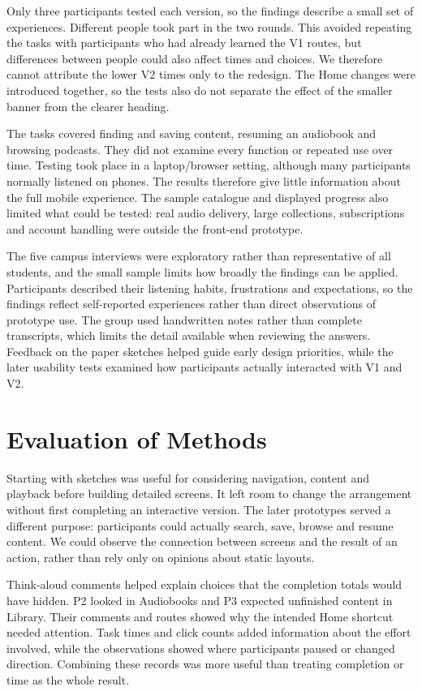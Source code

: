 Only three participants tested each version, so the findings describe a
small set of experiences. Different people took part in the two rounds.
This avoided repeating the tasks with participants who had already learned
the V1 routes, but differences between people could also affect times and
choices. We therefore cannot attribute the lower V2 times only to the
redesign. The Home changes were introduced together, so the tests also do
not separate the effect of the smaller banner from the clearer heading.

The tasks covered finding and saving content, resuming an audiobook and
browsing podcasts. They did not examine every function or repeated use over
time. Testing took place in a laptop/browser setting, although many
participants normally listened on phones. The results therefore give little
information about the full mobile experience. The sample catalogue and
displayed progress also limited what could be tested: real audio delivery,
large collections, subscriptions and account handling were outside the
front-end prototype.

The five campus interviews were exploratory rather than representative of
all students, and the small sample limits how broadly the findings can be
applied. Participants described their listening habits, frustrations and
expectations, so the findings reflect self-reported experiences rather than
direct observations of prototype use. The group used handwritten notes
rather than complete transcripts, which limits the detail available when
reviewing the answers. Feedback on the paper sketches helped guide early
design priorities, while the later usability tests examined how participants
actually interacted with V1 and V2.

\section{Evaluation of Methods}
\label{sec:discussion-methods}

Starting with sketches was useful for considering navigation, content and
playback before building detailed screens. It left room to change the
arrangement without first completing an interactive version. The later
prototypes served a different purpose: participants could actually search,
save, browse and resume content. We could observe the connection between
screens and the result of an action, rather than rely only on opinions
about static layouts.

Think-aloud comments helped explain choices that the completion totals
would have hidden. P2 looked in Audiobooks and P3 expected unfinished
content in Library. Their comments and routes showed why the intended
Home shortcut needed attention. Task times and click counts added
information about the effort involved, while the observations showed where
participants paused or changed direction. Combining these records was
more useful than treating completion or time as the whole result.

